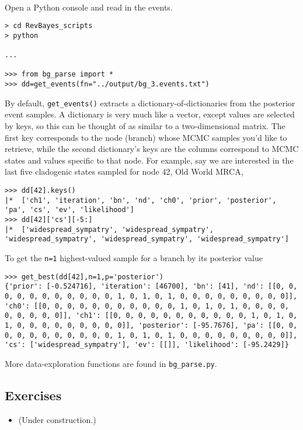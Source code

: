 \noindent \\ \impmark  Open a Python console and read in the events.

\begin{snugshade}
\begin{lstlisting}
> cd RevBayes_scripts
> python

...

>>> from bg_parse import *
>>> dd=get_events(fn="../output/bg_3.events.txt")
\end{lstlisting}
\end{snugshade}

By default, {\tt get\_events()} extracts a dictionary-of-dictionaries from the posterior event samples.
A dictionary is very much like a vector, except values are selected by keys, so this can be thought of as similar to a two-dimensional matrix.
The first key corresponds to the node (branch) whose MCMC samples you'd like to retrieve, while the second dictionary's keys are the columns correspond to MCMC states and values specific to that node. For example, say we are interested in the last five cladogenic states sampled for node 42, Old World MRCA,
\begin{snugshade}
\begin{lstlisting}
>>> dd[42].keys()
|*  ['ch1', 'iteration', 'bn', 'nd', 'ch0', 'prior', 'posterior', 'pa', 'cs', 'ev', 'likelihood']
>>> dd[42]['cs'][-5:]
|*  ['widespread_sympatry', 'widespread_sympatry', 'widespread_sympatry', 'widespread_sympatry', 'widespread_sympatry']
\end{lstlisting}
\end{snugshade}

To get the {\tt n=1} highest-valued sample for a branch by its posterior value
\begin{snugshade}
\begin{lstlisting}
>>> get_best(dd[42],n=1,p='posterior')
{'prior': [-0.524716], 'iteration': [46700], 'bn': [41], 'nd': [[0, 0, 0, 0, 0, 0, 0, 0, 0, 0, 0, 1, 0, 1, 0, 1, 0, 0, 0, 0, 0, 0, 0, 0, 0]], 'ch0': [[0, 0, 0, 0, 0, 0, 0, 0, 0, 0, 0, 1, 0, 1, 0, 1, 0, 0, 0, 0, 0, 0, 0, 0, 0]], 'ch1': [[0, 0, 0, 0, 0, 0, 0, 0, 0, 0, 0, 1, 0, 1, 0, 1, 0, 0, 0, 0, 0, 0, 0, 0, 0]], 'posterior': [-95.7676], 'pa': [[0, 0, 0, 0, 0, 0, 0, 0, 0, 0, 0, 1, 0, 1, 0, 1, 0, 0, 0, 0, 0, 0, 0, 0, 0]], 'cs': ['widespread_sympatry'], 'ev': [[]], 'likelihood': [-95.2429]}
\end{lstlisting}
\end{snugshade}

More data-exploration functions are found in {\tt bg\_parse.py}.

\subsection{Exercises}

\begin{itemize}
\item (Under construction.)
\end{itemize}




